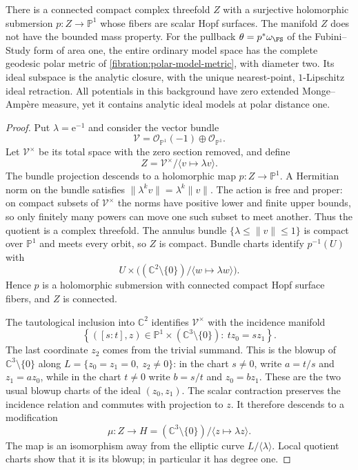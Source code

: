 \begin{example}\label{fibration:unbounded-hopf-threefold}
There is a connected compact complex threefold $Z$ with a
surjective holomorphic submersion $p:Z\to\mathbb P^1$ whose
fibers are scalar Hopf surfaces. The manifold $Z$ does not have
the bounded mass property. For the pullback
$\theta=p^*\omega_{\FS}$ of the Fubini--Study form of area one,
the entire ordinary model space has the complete geodesic polar
metric of \cref{fibration:polar-model-metric}, with diameter two.
Its ideal subspace is the analytic closure, with the unique
nearest-point, $1$-Lipschitz ideal retraction. All potentials
in this background have zero extended Monge--Amp\`ere measure,
yet it contains analytic ideal models at polar distance one.
\end{example}
\begin{proof}
Put $\lambda=\mathrm e^{-1}$ and consider the vector bundle
\[
 \mathcal V=\mathcal O_{\mathbb P^1}(-1)
                  \oplus\mathcal O_{\mathbb P^1}.
\]
Let $\mathcal V^\times$ be its total space with the zero section
removed, and define
\[
 Z=\mathcal V^\times/\langle v\mapsto\lambda v\rangle.
\]
The bundle projection descends to a holomorphic map
$p:Z\to\mathbb P^1$.
A Hermitian norm on the bundle satisfies
$\|\lambda^kv\|=\lambda^k\|v\|$. The action is free and proper:
on compact subsets of $\mathcal V^\times$ the norms have positive
lower and finite upper bounds, so only finitely many powers can
move one such subset to meet another. Thus the quotient is a
complex threefold. The annulus bundle
$\{\lambda\leq\|v\|\leq1\}$ is compact over $\mathbb P^1$ and
meets every orbit, so $Z$ is compact. Bundle charts identify
$p^{-1}(U)$ with
\[
 U\times\bigl((\mathbb C^2\setminus\{0\})/
                    \langle w\mapsto\lambda w\rangle\bigr).
\]
Hence $p$ is a holomorphic submersion with connected compact
Hopf surface fibers, and $Z$ is connected.

The tautological inclusion into $\mathbb C^2$ identifies
$\mathcal V^\times$ with the incidence manifold
\[
 \left\{([s:t],z)\in\mathbb P^1\times
      (\mathbb C^3\setminus\{0\}):\ t z_0=s z_1\right\}.
\]
The last coordinate $z_2$ comes from the trivial summand. This
is the blowup of $\mathbb C^3\setminus\{0\}$ along
$L=\{z_0=z_1=0,\ z_2\ne0\}$: in the chart $s\ne0$, write $a=t/s$ and
$z_1=az_0$, while in the chart $t\ne0$ write $b=s/t$ and
$z_0=bz_1$. These are the two usual blowup charts of the ideal
$(z_0,z_1)$. The scalar contraction preserves the incidence
relation and commutes with projection to $z$. It therefore
descends to a modification
\[
 \mu:Z\longrightarrow
 H=(\mathbb C^3\setminus\{0\})/
                \langle z\mapsto\lambda z\rangle.
\]
The map is an isomorphism away from the elliptic curve
$L/\langle\lambda\rangle$. Local quotient charts show that it
is its blowup; in particular it has degree one.


\end{proof}
